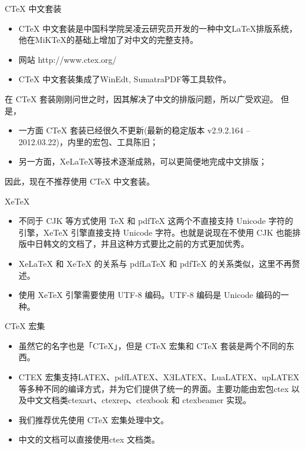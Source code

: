 \documentclass[13pt]{ctexbeamer}
\begin{document}
    
    
    
\begin{frame}{CTeX 中文套装}


\begin{itemize}
	\item 
	CTeX 中文套装是中国科学院吴凌云研究员开发的一种中文LaTeX排版系统，他在MiKTeX的基础上增加了对中文的完整支持。
	\item 
	网站  http://www.ctex.org/

\item CTeX 中文套装集成了WinEdt, SumatraPDF等工具软件。
\end{itemize}
在 CTeX 套装刚刚问世之时，因其解决了中文的排版问题，所以广受欢迎。 但是，
\begin{itemize}
	\item  一方面 CTeX 套装已经很久不更新(最新的稳定版本	v2.9.2.164 -- 2012.03.22)，内里的宏包、工具陈旧；
	\item 另一方面，XeLaTeX等技术逐渐成熟，可以更简便地完成中文排版；
\end{itemize}

	因此，\alert{现在不推荐使用 CTeX 中文套装}。

\end{frame}

    
\begin{frame}{XeTeX}

\begin{itemize}
    \item 不同于 CJK 等方式使用 TeX 和 pdfTeX 这两个不直接支持 Unicode 字符的引擎，\alert{XeTeX 引擎}直接支持 Unicode 字符。也就是说现在不使用 CJK 也能排版中日韩文的文档了，并且这种方式要比之前的方式更加优秀。
    
    \item XeLaTeX 和 XeTeX 的关系与 pdfLaTeX 和 pdfTeX 的关系类似，这里不再赘述。

 \item  使用 XeTeX 引擎需要使用 \alert{UTF-8 编码}。{UTF-8 编码}是 Unicode 编码的一种。
\end{itemize}
\end{frame}




\begin{frame}
{CTeX 宏集}
\begin{itemize}
	\item 
虽然它的名字也是「CTeX」，但是 CTeX 宏集和 CTeX 套装是两个不同的东西。
\item  CTEX 宏集支持LATEX、pdfLATEX、XƎLATEX、LuaLATEX、upLATEX 等多种不同的编译方式，并为它们提供了统一的界面。主要功能由宏包ctex 以及中文文档类ctexart、ctexrep、ctexbook 和 ctexbeamer 实现。
\item 我们推荐\alert{优先使用 CTeX 宏集处理中文}。
\item 中文的文档可以直接使用ctex 文档类。
\end{itemize}

 
\end{frame}
\end{document}
